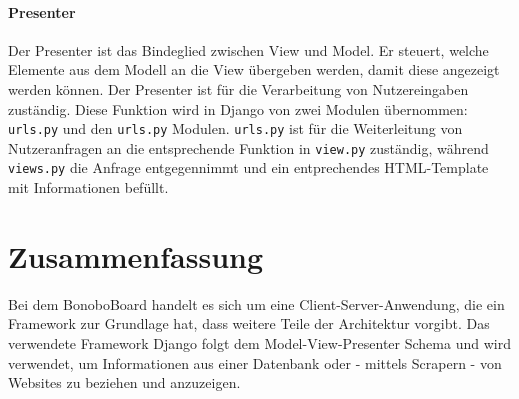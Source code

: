 \documentclass[a4paper,11pt]{scrartcl}
\begin{document}
\paragraph{Presenter}
Der Presenter ist das Bindeglied zwischen View und Model. Er steuert, welche Elemente aus dem Modell an die View übergeben werden, damit diese angezeigt werden können. Der Presenter ist für die Verarbeitung von Nutzereingaben zuständig. Diese Funktion wird in Django von zwei Modulen übernommen: \texttt{urls.py} und den \texttt{urls.py} Modulen. \texttt{urls.py} ist für die Weiterleitung von Nutzeranfragen an die entsprechende Funktion in \texttt{view.py} zuständig, während \texttt{views.py} die Anfrage entgegennimmt und ein entprechendes HTML-Template mit Informationen befüllt.


\section{Zusammenfassung}
Bei dem BonoboBoard handelt es sich um eine Client-Server-Anwendung, die ein Framework zur Grundlage hat, dass weitere Teile der Architektur vorgibt. Das verwendete Framework Django folgt dem Model-View-Presenter Schema und wird verwendet, um Informationen aus einer Datenbank oder - mittels Scrapern - von Websites zu beziehen und anzuzeigen. 


\end{document}

